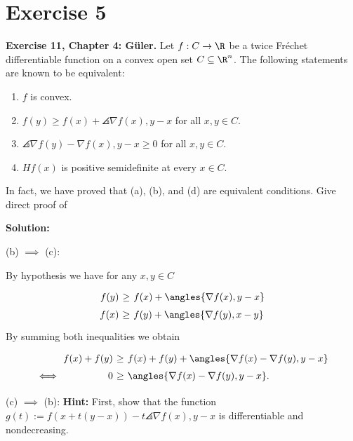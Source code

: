 
\section*{Exercise 5}

\textbf{Exercise 11, Chapter 4: Güler.} Let $f: C \to \R$ be a twice Fréchet differentiable function on a convex open set $C\subseteq \R^n$. The following statements are known to be equivalent:
\begin{enumerate}[label=(\alph*)]
    \item $f$ is convex.
    \item $f(y) \geq f(x) + \angles{\nabla f(x), y-x}$ for all $x,y\in C$.
    \item $\angles{\nabla f(y) - \nabla f(x), y-x} \geq 0$ for all $x,y \in C$.
    \item $ H f(x)$ is positive semidefinite at every $x \in C$.
\end{enumerate}

In fact, we have proved that (a), (b), and (d) are equivalent conditions. Give direct proof of

\textbf{Solution:}

\hspace*{-3em} (b) $\implies$ (c):

By hypothesis we have for any $x,y\in C$
\[ \everymath{\displaystyle}
\arraycolsep=1.8pt\def\arraystretch{1.5}
\begin{array}{rcl}
    f(y) & \geq & f(x) + \angles{\nabla f(x), y-x} \\
    f(x) & \geq & f(y) + \angles{\nabla f(y), x-y} 
\end{array}\]
By summing both inequalities we obtain
\[ \everymath{\displaystyle}
\arraycolsep=1.8pt\def\arraystretch{1.5}
\begin{array}{rrcl}
    & f(x)+f(y) & \geq & f(x)+f(y) + \angles{\nabla f(x) - \nabla f(y), y-x} \\
    \iff & 0 & \geq & \angles{\nabla f(x) - \nabla f(y), y-x}.\\
\end{array} \]

\hspace*{-3em} (c) $\implies$ (b): \textbf{Hint:} First, show that the function $g(t) :=f (x+t(y-x))-t\angles{\nabla f(x), y-x}$ is differentiable and nondecreasing.

